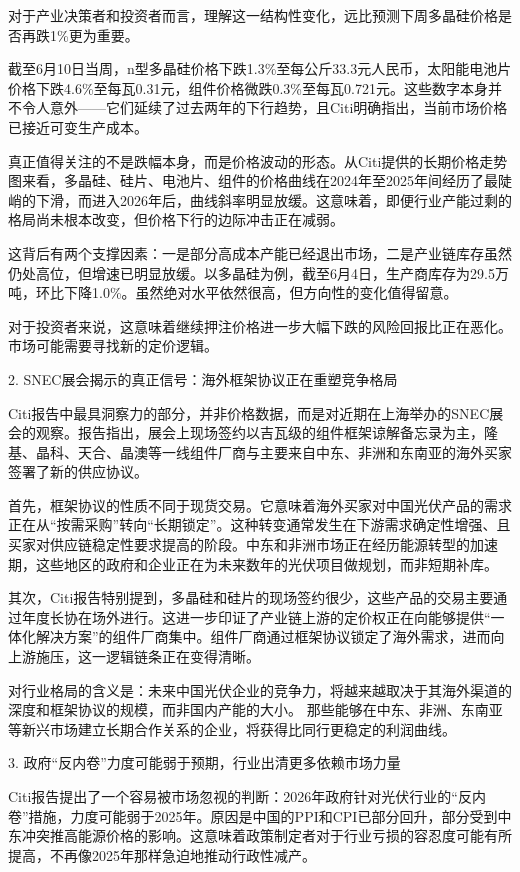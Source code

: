 \documentclass[11pt]{ctexart}
\begin{document}
对于产业决策者和投资者而言，理解这一结构性变化，远比预测下周多晶硅价格是否再跌1\%更为重要。

截至6月10日当周，n型多晶硅价格下跌1.3\%至每公斤33.3元人民币，太阳能电池片价格下跌4.6\%至每瓦0.31元，组件价格微跌0.3\%至每瓦0.721元。这些数字本身并不令人意外——它们延续了过去两年的下行趋势，且Citi明确指出，当前市场价格已接近可变生产成本。

真正值得关注的不是跌幅本身，而是价格波动的形态。从Citi提供的长期价格走势图来看，多晶硅、硅片、电池片、组件的价格曲线在2024年至2025年间经历了最陡峭的下滑，而进入2026年后，曲线斜率明显放缓。这意味着，即便行业产能过剩的格局尚未根本改变，但价格下行的边际冲击正在减弱。

这背后有两个支撑因素：一是部分高成本产能已经退出市场，二是产业链库存虽然仍处高位，但增速已明显放缓。以多晶硅为例，截至6月4日，生产商库存为29.5万吨，环比下降1.0\%。虽然绝对水平依然很高，但方向性的变化值得留意。

对于投资者来说，这意味着继续押注价格进一步大幅下跌的风险回报比正在恶化。市场可能需要寻找新的定价逻辑。

2. SNEC展会揭示的真正信号：海外框架协议正在重塑竞争格局

Citi报告中最具洞察力的部分，并非价格数据，而是对近期在上海举办的SNEC展会的观察。报告指出，展会上现场签约以吉瓦级的组件框架谅解备忘录为主，隆基、晶科、天合、晶澳等一线组件厂商与主要来自中东、非洲和东南亚的海外买家签署了新的供应协议。

首先，框架协议的性质不同于现货交易。它意味着海外买家对中国光伏产品的需求正在从“按需采购”转向“长期锁定”。这种转变通常发生在下游需求确定性增强、且买家对供应链稳定性要求提高的阶段。中东和非洲市场正在经历能源转型的加速期，这些地区的政府和企业正在为未来数年的光伏项目做规划，而非短期补库。

其次，Citi报告特别提到，多晶硅和硅片的现场签约很少，这些产品的交易主要通过年度长协在场外进行。这进一步印证了产业链上游的定价权正在向能够提供“一体化解决方案”的组件厂商集中。组件厂商通过框架协议锁定了海外需求，进而向上游施压，这一逻辑链条正在变得清晰。

对行业格局的含义是：未来中国光伏企业的竞争力，将越来越取决于其海外渠道的深度和框架协议的规模，而非国内产能的大小。 那些能够在中东、非洲、东南亚等新兴市场建立长期合作关系的企业，将获得比同行更稳定的利润曲线。

3. 政府“反内卷”力度可能弱于预期，行业出清更多依赖市场力量

Citi报告提出了一个容易被市场忽视的判断：2026年政府针对光伏行业的“反内卷”措施，力度可能弱于2025年。原因是中国的PPI和CPI已部分回升，部分受到中东冲突推高能源价格的影响。这意味着政策制定者对于行业亏损的容忍度可能有所提高，不再像2025年那样急迫地推动行政性减产。
\end{document}
